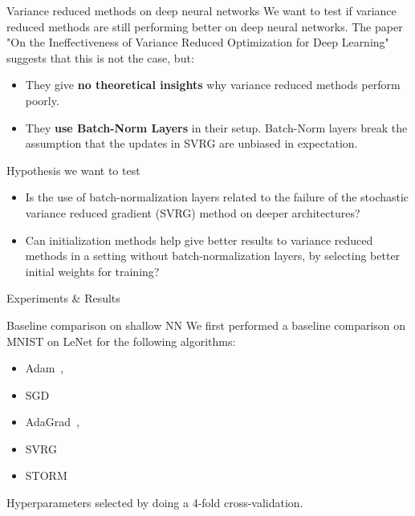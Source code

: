 \documentclass[10pt]{beamer}
\begin{document}
\begin{frame}{Variance reduced methods on deep neural networks}
    We want to test if variance reduced methods are still performing better on deep neural networks.
    \newline
    The paper "On the Ineffectiveness of Variance Reduced
    Optimization for Deep Learning"~\citep{Defazio2019} suggests that this is not the case, but:
    \begin{itemize}
        \item They give \textbf{no theoretical insights} why variance reduced methods perform poorly.
        \item They \textbf{use Batch-Norm Layers} in their setup. Batch-Norm layers break the assumption that the updates in SVRG are unbiased in expectation.
    \end{itemize}
\end{frame}

\begin{frame}{Hypothesis we want to test}
    \begin{itemize}
        \item Is the use of batch-normalization layers related to the failure of the stochastic variance reduced gradient (SVRG) method on deeper architectures?
        \item Can initialization methods help give better results to variance reduced methods in a setting without batch-normalization layers, by selecting better initial weights for training?
    \end{itemize}
    
\end{frame}

\begin{frame}{ }
    \begin{center}
        \Huge Experiments \& Results
    \end{center}
\end{frame}
\begin{frame}{Baseline comparison on shallow NN}
    We first performed a baseline comparison on MNIST on LeNet for the following algorithms:
    \begin{itemize}
        \item Adam~\citep{kingma2014adam},
        \item SGD
        \item AdaGrad~\citep{john2011adagrad}, 
        \item SVRG
        \item STORM
    \end{itemize}
    
    Hyperparameters selected by doing a 4-fold cross-validation.
\end{frame}
\end{document}

